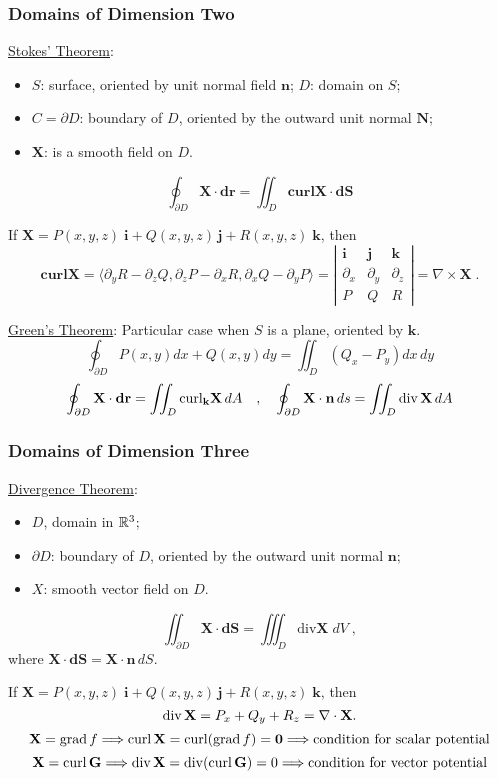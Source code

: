 \begin{frame}
  \frametitle{Domains of Dimension Two}

\underline{Stokes' Theorem}:
\begin{itemize}
  \item $S$: surface, oriented by unit normal field $\textbf{n}$; $D$: domain on $S$;
  \item $C=\partial D$: boundary of $D$, oriented by the outward unit normal $\textbf{N}$;
  \item $\textbf{X}$: is a smooth field on $D$.
\end{itemize}
$$
  \oint_{\partial D} \textbf{X} \cdot \textbf{dr} = \iint_D \textbf{curl} \textbf{X} \cdot \textbf{dS}
$$

If $\textbf{X} = P(x,y,z)\; \textbf{i} + Q(x,y,z)\, \textbf{j} + R(x,y,z)\; \textbf{k}$, then
%
$$ \textbf{curl} \textbf{X} =\langle \partial_y R - \partial_z Q, \partial_z P - \partial_x R, \partial_x Q - \partial_y P\rangle = \left| \begin{array}{ccc}
  \textbf{i} & \textbf{j} & \textbf{k} \\
  \partial_x & \partial_y & \partial_z \\
  P & Q & R
\end{array}\right| = \nabla \times \textbf{X}\; .$$

\underline{Green's Theorem}: Particular case when $S$ is a plane, oriented by $\textbf{k}$.
$$
  \oint_{\partial D} P(x,y) dx + Q(x,y) dy = \iint_D \left( Q_x - P_y\right) dx\,dy
$$
$$
  \oint_{\partial D} \textbf{X} \cdot \textbf{dr} = \iint_D \text{curl}_{\textbf{k}} \textbf{X}\, dA \quad , \quad
  \oint_{\partial D} \textbf{X} \cdot \textbf{n}\,ds = \iint_D \operatorname{div}  \textbf{X}\, dA
$$
\end{frame}

\begin{frame}
  \frametitle{Domains of Dimension Three}

  \underline{Divergence Theorem}:
   \begin{itemize}
     \item $D$, domain in ${\mathbb{R}}^3$;
     \item $\partial D$: boundary of $D$, oriented by the outward unit normal $\textbf{n}$;
     \item $X$: smooth vector field on $D$.
   \end{itemize}
%
$$
  \iint_{\partial D} \textbf{X} \cdot \textbf{dS} = \iiint_D \text{div} \textbf{X} \;dV \; ,
$$
%
where $\textbf{X} \cdot \textbf{dS} = \textbf{X} \cdot \textbf{n} \, dS$.

\medskip
If $\textbf{X} = P(x,y,z)\; \textbf{i} + Q(x,y,z)\, \textbf{j} + R(x,y,z)\; \textbf{k}$, then
%
$$\operatorname{div} \textbf{X} = P_x + Q_y + R_z = \nabla \cdot \textbf{X}.$$
%
$$\textbf{X}=\operatorname{\bm{grad}} f \Longrightarrow \operatorname{\bm{curl}} \textbf{X} = \operatorname{\bm{curl}} (\operatorname{\bm{grad}} f) = \textbf{0} \Longrightarrow \text{condition for scalar potential}$$
%
$$\textbf{X}=\operatorname{\bm{curl}} \textbf{G} \Longrightarrow \operatorname{div} \textbf{X} = \operatorname{div} (\operatorname{\bm{curl}} \textbf{G}) = 0 \Longrightarrow \text{condition for vector potential}$$

\end{frame}

